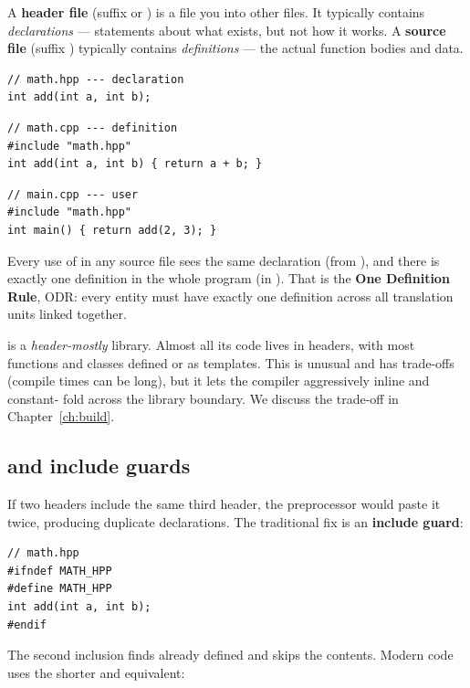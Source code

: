 A \textbf{header file} (suffix  or ) is a file
you  into other files. It typically contains
\emph{declarations} --- statements about what exists, but not how it
works. A \textbf{source file} (suffix ) typically contains
\emph{definitions} --- the actual function bodies and data.

\begin{lstlisting}
// math.hpp --- declaration
int add(int a, int b);
\end{lstlisting}

\begin{lstlisting}
// math.cpp --- definition
#include "math.hpp"
int add(int a, int b) { return a + b; }
\end{lstlisting}

\begin{lstlisting}
// main.cpp --- user
#include "math.hpp"
int main() { return add(2, 3); }
\end{lstlisting}

Every use of  in any source file sees the same declaration
(from ), and there is exactly one definition in the
whole program (in ). That is the \textbf{One Definition
Rule}, ODR: every entity must have exactly one definition across all
translation units linked together.

\maya{} is a \emph{header-mostly} library. Almost all its code lives
in headers, with most functions and classes defined  or
as templates. This is unusual and has trade-offs (compile times can
be long), but it lets the compiler aggressively inline and constant-
fold across the library boundary. We discuss the trade-off in
Chapter~\ref{ch:build}.

\subsection{ and include guards}

If two headers include the same third header, the preprocessor would
paste it twice, producing duplicate declarations. The traditional
fix is an \textbf{include guard}:

\begin{lstlisting}
// math.hpp
#ifndef MATH_HPP
#define MATH_HPP
int add(int a, int b);
#endif
\end{lstlisting}

The second inclusion finds  already defined and skips
the contents. Modern code uses the shorter and equivalent:

